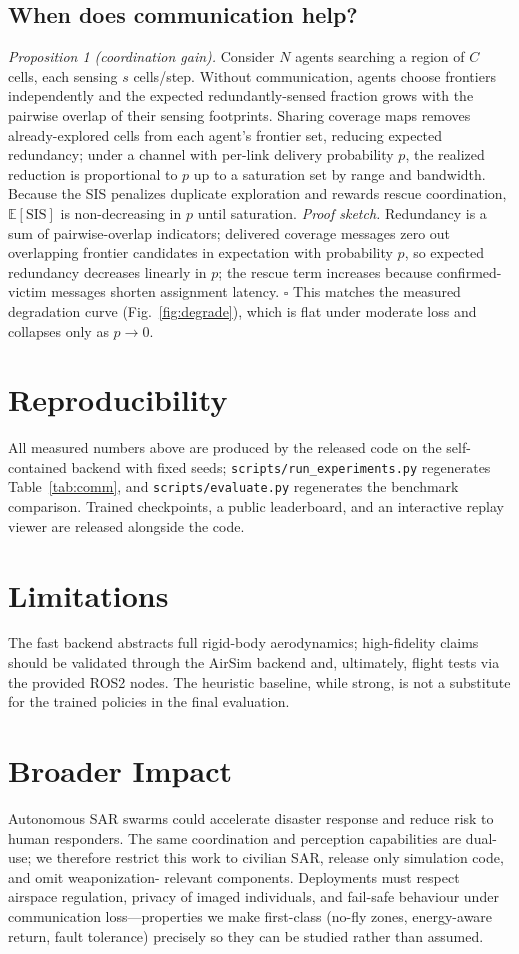 \documentclass[twocolumn,10pt]{article}
\begin{document}
\subsection{When does communication help?}
\emph{Proposition 1 (coordination gain).} Consider $N$ agents searching a region of $C$
cells, each sensing $s$ cells/step. Without communication, agents choose frontiers
independently and the expected redundantly-sensed fraction grows with the pairwise
overlap of their sensing footprints. Sharing coverage maps removes already-explored
cells from each agent's frontier set, reducing expected redundancy; under a channel with
per-link delivery probability $p$, the realized reduction is proportional to $p$ up to a
saturation set by range and bandwidth. Because the SIS penalizes duplicate exploration and
rewards rescue coordination, $\mathbb{E}[\mathrm{SIS}]$ is non-decreasing in $p$ until
saturation. \emph{Proof sketch.} Redundancy is a sum of pairwise-overlap indicators;
delivered coverage messages zero out overlapping frontier candidates in expectation with
probability $p$, so expected redundancy decreases linearly in $p$; the rescue term
increases because confirmed-victim messages shorten assignment latency. $\square$ This
matches the measured degradation curve (Fig.~\ref{fig:degrade}), which is flat under
moderate loss and collapses only as $p\!\to\!0$.

\section{Reproducibility}
All measured numbers above are produced by the released code on the self-contained
backend with fixed seeds; \texttt{scripts/run\_experiments.py} regenerates
Table~\ref{tab:comm}, and \texttt{scripts/evaluate.py} regenerates the benchmark
comparison. Trained checkpoints, a public leaderboard, and an interactive replay
viewer are released alongside the code.

\section{Limitations}
The fast backend abstracts full rigid-body aerodynamics; high-fidelity claims
should be validated through the AirSim backend and, ultimately, flight tests via
the provided ROS2 nodes. The heuristic baseline, while strong, is not a substitute
for the trained policies in the final evaluation.

\section{Broader Impact}
Autonomous SAR swarms could accelerate disaster response and reduce risk to human
responders. The same coordination and perception capabilities are dual-use; we therefore
restrict this work to civilian SAR, release only simulation code, and omit weaponization-
relevant components. Deployments must respect airspace regulation, privacy of imaged
individuals, and fail-safe behaviour under communication loss---properties we make
first-class (no-fly zones, energy-aware return, fault tolerance) precisely so they can be
studied rather than assumed.
\end{document}
